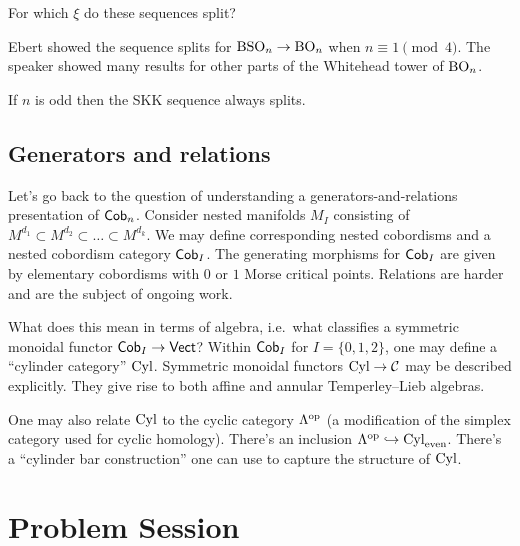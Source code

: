 \documentclass{amsart}
\begin{document}
\begin{qn}
  For which $\xi$ do these sequences split?
\end{qn}

Ebert showed the sequence splits for $\mathrm{BSO}_n \to \mathrm{BO}_n$ when $n \equiv 1 \pmod 4$.
The speaker showed many results for other parts of the Whitehead tower of $\mathrm{BO}_n$.

\begin{conj}
  If $n$ is odd then the SKK sequence always splits.
\end{conj}

\subsection{Generators and relations}

Let's go back to the question of understanding a generators-and-relations presentation of $\mathsf{Cob}_n$.
Consider nested manifolds $M_I$ consisting of $M^{d_1} \subset M^{d_2} \subset \dots \subset M^{d_k}$.
We may define corresponding nested cobordisms and a nested cobordism category $\mathsf{Cob}_I$.
The generating morphisms for $\mathsf{Cob}_I$ are given by elementary cobordisms with $0$ or $1$ Morse critical points.
Relations are harder and are the subject of ongoing work.

What does this mean in terms of algebra, i.e.\ what classifies a symmetric monoidal functor $\mathsf{Cob}_I \to \mathsf{Vect}$?
Within $\mathsf{Cob}_I$ for $I = \{0, 1, 2\}$, one may define a ``cylinder category'' $\operatorname{Cyl}$.
Symmetric monoidal functors $\operatorname{Cyl} \to \mathcal{C}$ may be described explicitly.
They give rise to both affine and annular Temperley--Lieb algebras.

One may also relate $\operatorname{Cyl}$ to the cyclic category $\Lambda^{\mathrm{op}}$ (a modification of the simplex category used for cyclic homology).
There's an inclusion $\Lambda^{\mathrm{op}} \hookrightarrow \operatorname{Cyl}_\mathrm{even}$.
There's a ``cylinder bar construction'' one can use to capture the structure of $\operatorname{Cyl}$.

\section{Problem Session}
\end{document}
